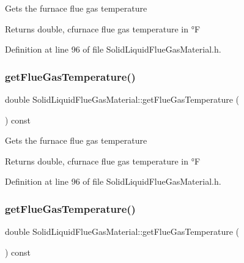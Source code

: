 Gets the furnace flue gas temperature \begin{DoxyReturn}{Returns}
double, cfurnace flue gas temperature in °F 
\end{DoxyReturn}


Definition at line 96 of file Solid\+Liquid\+Flue\+Gas\+Material.\+h.

\mbox{\label{class_solid_liquid_flue_gas_material_aba4604158b3c624496d7de4b5fb511e2}} 
\subsubsection{\texorpdfstring{get\+Flue\+Gas\+Temperature()}{getFlueGasTemperature()}\hspace{0.1cm}{\footnotesize\ttfamily [2/3]}}
{\footnotesize\ttfamily double Solid\+Liquid\+Flue\+Gas\+Material\+::get\+Flue\+Gas\+Temperature (\begin{DoxyParamCaption}{ }\end{DoxyParamCaption}) const\hspace{0.3cm}{\ttfamily [inline]}}

Gets the furnace flue gas temperature \begin{DoxyReturn}{Returns}
double, cfurnace flue gas temperature in °F 
\end{DoxyReturn}


Definition at line 96 of file Solid\+Liquid\+Flue\+Gas\+Material.\+h.

\mbox{\label{class_solid_liquid_flue_gas_material_aba4604158b3c624496d7de4b5fb511e2}} 
\subsubsection{\texorpdfstring{get\+Flue\+Gas\+Temperature()}{getFlueGasTemperature()}\hspace{0.1cm}{\footnotesize\ttfamily [3/3]}}
{\footnotesize\ttfamily double Solid\+Liquid\+Flue\+Gas\+Material\+::get\+Flue\+Gas\+Temperature (\begin{DoxyParamCaption}{ }\end{DoxyParamCaption}) const\hspace{0.3cm}{\ttfamily [inline]}}


